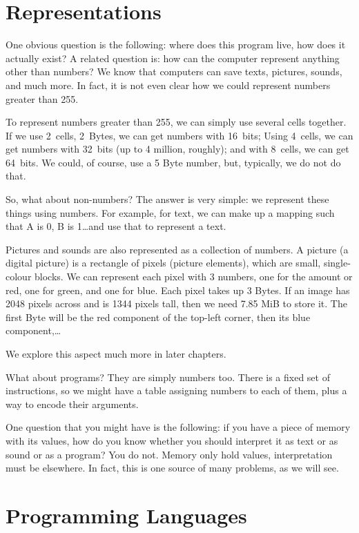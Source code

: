 \section{Representations}

One obvious question is the following: where does this program live, how does
it actually exist? A related question is: how can the computer represent
anything other than numbers? We know that computers can save texts, pictures,
sounds, and much more. In fact, it is not even clear how we could represent
numbers greater than 255.

To represent numbers greater than 255, we can simply use several cells
together. If we use 2~cells, 2~Bytes, we can get numbers with 16~bits; Using
4~cells, we can get numbers with 32~bits (up to 4 million, roughly); and with
8~cells, we can get 64~bits. We could, of course, use a 5 Byte number, but,
typically, we do not do that.

So, what about non-numbers?  The answer is very simple: we represent these
things using numbers. For example, for text, we can make up a mapping such that
A is 0, B is 1\ldots and use that to represent a text.

Pictures and sounds are also represented as a collection of numbers. A picture
(a digital picture) is a rectangle of pixels (picture elements), which are
small, single-colour blocks. We can represent each pixel with 3 numbers, one
for the amount or red, one for green, and one for blue. Each pixel takes up 3
Bytes. If an image has 2048 pixels across and is 1344 pixels tall, then we need
7.85 MiB to store it. The first Byte will be the red component of the top-left
corner, then its blue component,\ldots

We explore this aspect much more in later chapters.

What about programs? They are simply numbers too. There is a fixed set of
instructions, so we might have a table assigning numbers to each of them, plus
a way to encode their arguments.

One question that you might have is the following: if you have a piece of
memory with its values, how do you know whether you should interpret it as text
or as sound or as a program? You do not. Memory only hold values,
interpretation must be elsewhere. In fact, this is one source of many problems,
as we will see.

\section{Programming Languages}

